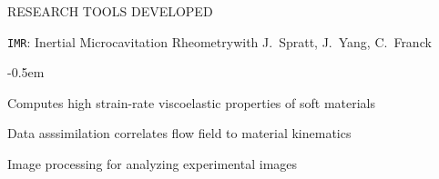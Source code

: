 \documentclass{resume} %
\newcommand{\sepss}{-0.5em}
\newcommand{\negspace}{-0.8em}
\begin{document}
\begin{rSection}{{\Large R}ESEARCH TOOLS DEVELOPED}
\begin{rSubsections}{\texttt{IMR}: Inertial Microcavitation Rheometry}{}{with J.\ Spratt, J.\ Yang, C.\ Franck}{}
	\begin{list}{\textbullet}{\leftmargin=2.5em} 
	    \itemsep \sepss 
	  	\vspace{\negspace} 
        \item Computes high strain-rate viscoelastic properties of soft materials
        \item Data asssimilation correlates flow field to material kinematics
        \item Image processing for analyzing experimental images
  	\end{list}
\end{rSubsections}

\end{rSection}
\end{document}
